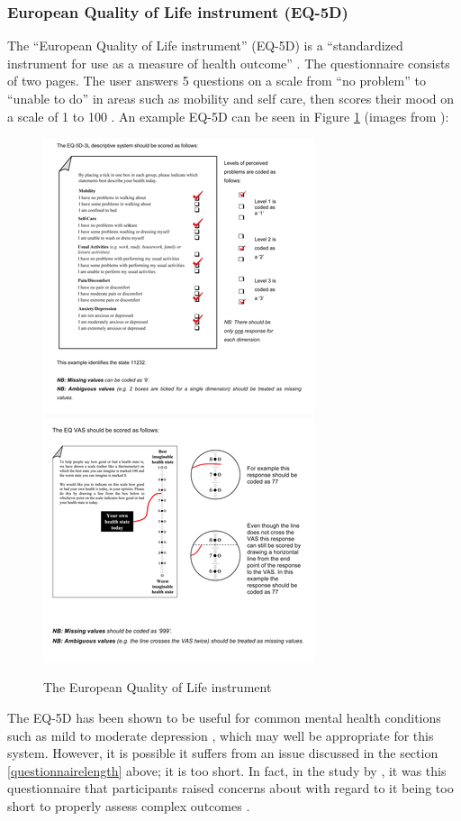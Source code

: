 \documentclass[11pt,openright,a4paper]{report}
\begin{document}
\newpage
\subsubsection{European Quality of Life instrument (EQ-5D)}
The \enquote{European Quality of Life instrument} (EQ-5D) is a \enquote{standardized instrument for use as a measure of health outcome} \parencite{eq5dabout}. The questionnaire consists of two pages. The user answers 5 questions on a scale from \enquote{no problem} to \enquote{unable to do} in areas such as mobility and self care, then scores their mood on a scale of 1 to 100 \parencite{eq5duse}. An example EQ-5D can be seen in Figure \ref{fig:eq5d} (images from \parencite{eq5duse}):

\begin{figure}[ht]
\caption{The European Quality of Life instrument}
\includegraphics[width=.5\textwidth]{i/eq5d1.jpg}\hfill
\includegraphics[width=.5\textwidth]{i/eq5d2.jpg}
\label{fig:eq5d}
\end{figure}

The EQ-5D has been shown to be useful for common mental health conditions such as mild to moderate depression \parencite{brazier2010eq}, which may well be appropriate for this system. However, it is possible it suffers from an issue discussed in the section \ref{questionnairelength} above; it is too short. In fact, in the study by \citeauthor{crawford2011selecting}, it was this questionnaire that participants raised concerns about with regard to it being too short to properly assess complex outcomes \parencite{crawford2011selecting}.
\end{document}
